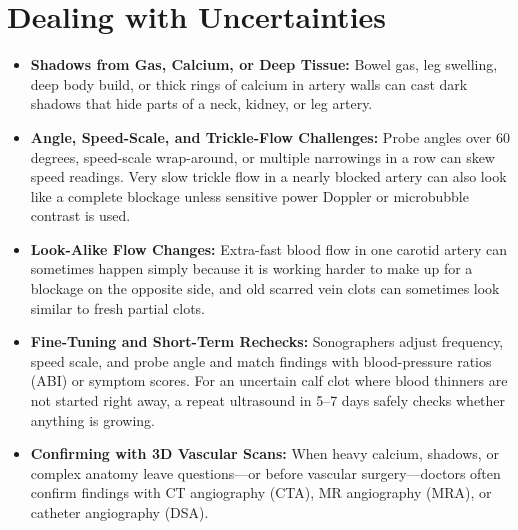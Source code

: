 \section{Dealing with Uncertainties}
\begin{itemize}
\item \textbf{Shadows from Gas, Calcium, or Deep Tissue:} Bowel gas, leg swelling, deep body build, or thick rings of calcium in artery walls can cast dark shadows that hide parts of a neck, kidney, or leg artery.
\item \textbf{Angle, Speed-Scale, and Trickle-Flow Challenges:} Probe angles over 60 degrees, speed-scale wrap-around, or multiple narrowings in a row can skew speed readings. Very slow trickle flow in a nearly blocked artery can also look like a complete blockage unless sensitive power Doppler or microbubble contrast is used.
\item \textbf{Look-Alike Flow Changes:} Extra-fast blood flow in one carotid artery can sometimes happen simply because it is working harder to make up for a blockage on the opposite side, and old scarred vein clots can sometimes look similar to fresh partial clots.
\item \textbf{Fine-Tuning and Short-Term Rechecks:} Sonographers adjust frequency, speed scale, and probe angle and match findings with blood-pressure ratios (ABI) or symptom scores. For an uncertain calf clot where blood thinners are not started right away, a repeat ultrasound in 5--7 days safely checks whether anything is growing.
\item \textbf{Confirming with 3D Vascular Scans:} When heavy calcium, shadows, or complex anatomy leave questions---or before vascular surgery---doctors often confirm findings with CT angiography (CTA), MR angiography (MRA), or catheter angiography (DSA).
\end{itemize}

